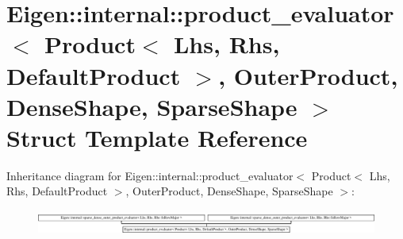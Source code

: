 \hypertarget{struct_eigen_1_1internal_1_1product__evaluator_3_01_product_3_01_lhs_00_01_rhs_00_01_default_pro2587512d8613ab7eaf4e89d5bc171599}{}\section{Eigen\+:\+:internal\+:\+:product\+\_\+evaluator$<$ Product$<$ Lhs, Rhs, Default\+Product $>$, Outer\+Product, Dense\+Shape, Sparse\+Shape $>$ Struct Template Reference}
\label{struct_eigen_1_1internal_1_1product__evaluator_3_01_product_3_01_lhs_00_01_rhs_00_01_default_pro2587512d8613ab7eaf4e89d5bc171599}
Inheritance diagram for Eigen\+:\+:internal\+:\+:product\+\_\+evaluator$<$ Product$<$ Lhs, Rhs, Default\+Product $>$, Outer\+Product, Dense\+Shape, Sparse\+Shape $>$\+:\begin{figure}[H]
\begin{center}
\leavevmode
\includegraphics[height=0.805755cm]{struct_eigen_1_1internal_1_1product__evaluator_3_01_product_3_01_lhs_00_01_rhs_00_01_default_pro2587512d8613ab7eaf4e89d5bc171599}
\end{center}
\end{figure}

